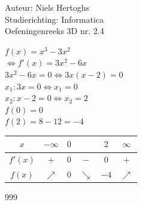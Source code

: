 \documentclass[a4paper]{article}
\begin{document}
  
\noindent \large Auteur: Niels Hertoghs \\
\noindent \large Studierichting: Informatica\\
\noindent \large Oefeningenreeks 3D nr. 2.4\\



\medskip

\normalsize

$f(x) = x^3-3x^2$ \\

$\Leftrightarrow f'(x) = 3x^2 - 6x$ \\

$3x^2 - 6x = 0 \Leftrightarrow 3x(x - 2) = 0$ \\

$x_1 : 3x = 0 \Leftrightarrow x_1 = 0$\\

$x_2 : x - 2 = 0 \Leftrightarrow x_2 = 2$\\

$f(0) = 0$\\

$f(2) = 8 - 12 = -4$\\

\begin{tabular}{c|ccccc}
$x$			&$-\infty$ 	 & $0$	&							& $2$	& $\infty$   \\ \hline 
$f'(x)$ &$+$				 & $0$	& $-$					& $0$	& $+$				 \\
$f(x)$  &$\nearrow$	 & $0$	& $\searrow$	& $-4$	& $\nearrow$	
\end{tabular}

\bigskip
 
\begin{thebibliography}{999}
\end{thebibliography}
\end{document}
